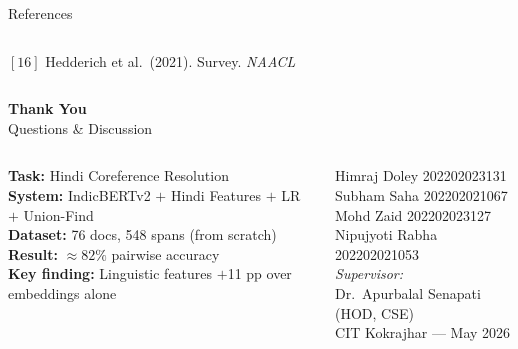 \documentclass[aspectratio=169]{beamer}
\begin{document}
\begin{frame}{References}
\begin{columns}[T]
      \vspace{5pt}
      \begin{tcolorbox}[gbox={Low-Resource NLP}]
        \scriptsize
        $[16]$ Hedderich et al.\ (2021). Survey. \textit{NAACL}
      \end{tcolorbox}
  \end{columns}
\end{frame}

\begin{frame}
  \vspace{0.4cm}
  \begin{center}
    {\Huge\bfseries\color{midnightblue} Thank You}\\[0.6cm]
    {\large\color{darktext!70} Questions \& Discussion}
  \end{center}

  \vspace{0.5cm}
  \begin{columns}[c]
      \begin{tcolorbox}[nbox={Project Summary}]
        \small
        \textbf{Task:} Hindi Coreference Resolution\\[3pt]
        \textbf{System:} IndicBERTv2 $+$ Hindi Features
        $+$ LR $+$ Union-Find\\[3pt]
        \textbf{Dataset:} 76 docs, 548 spans (from scratch)\\[3pt]
        \textbf{Result:} ${\approx}82\%$ pairwise accuracy\\[3pt]
        \textbf{Key finding:} Linguistic features $+$11 pp
        over embeddings alone
      \end{tcolorbox}

      \begin{tcolorbox}[rbox={Team}]
        \small
        Himraj Doley \hfill 202202023131\\
        Subham Saha \hfill 202202021067\\
        Mohd Zaid \hfill 202202023127\\
        Nipujyoti Rabha \hfill 202202021053\\[5pt]
        \textit{Supervisor:}\\
        Dr.\ Apurbalal Senapati (HOD, CSE)\\[3pt]
        CIT Kokrajhar — May 2026
      \end{tcolorbox}
  \end{columns}
\end{frame}
\end{document}
